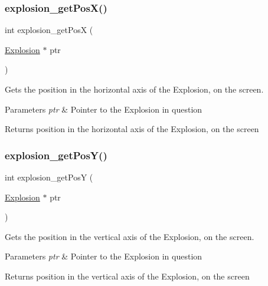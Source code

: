 \subsubsection{\texorpdfstring{explosion\+\_\+get\+Pos\+X()}{explosion\_getPosX()}}
{\footnotesize\ttfamily int explosion\+\_\+get\+PosX (\begin{DoxyParamCaption}\item[{\hyperlink{group___missile_gab15157e0eccd9297f66644015d4966b1}{Explosion} $\ast$}]{ptr }\end{DoxyParamCaption})}



Gets the position in the horizontal axis of the Explosion, on the screen. 


\begin{DoxyParams}{Parameters}
{\em ptr} & Pointer to the Explosion in question\\
\hline
\end{DoxyParams}
\begin{DoxyReturn}{Returns}
position in the horizontal axis of the Explosion, on the screen 
\end{DoxyReturn}
\hypertarget{group___missile_gab7f446e98be5f55752942865f5e10be4}{}\label{group___missile_gab7f446e98be5f55752942865f5e10be4} 
\subsubsection{\texorpdfstring{explosion\+\_\+get\+Pos\+Y()}{explosion\_getPosY()}}
{\footnotesize\ttfamily int explosion\+\_\+get\+PosY (\begin{DoxyParamCaption}\item[{\hyperlink{group___missile_gab15157e0eccd9297f66644015d4966b1}{Explosion} $\ast$}]{ptr }\end{DoxyParamCaption})}



Gets the position in the vertical axis of the Explosion, on the screen. 


\begin{DoxyParams}{Parameters}
{\em ptr} & Pointer to the Explosion in question\\
\hline
\end{DoxyParams}
\begin{DoxyReturn}{Returns}
position in the vertical axis of the Explosion, on the screen 
\end{DoxyReturn}
\hypertarget{group___missile_ga41c747ea318363b16bce9e8bb8ea19ec}{}\label{group___missile_ga41c747ea318363b16bce9e8bb8ea19ec} 
